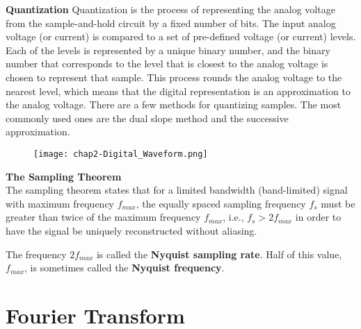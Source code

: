 \begin{compactitem}
\item \textbf{Quantization}
Quantization is the process of representing the analog voltage from the sample-and-hold
circuit by a fixed number of bits. The input analog voltage (or current) is compared to
a set of pre-defined voltage (or current) levels. Each of the levels is represented
by a unique binary number, and the binary number that corresponds to the level that is
closest to the analog voltage is chosen to represent that sample. This process rounds
the analog voltage to the nearest level, which means that the digital representation
is an approximation to the analog voltage. There are a few methods for quantizing samples.
The most commonly used ones are the dual slope method and the successive approximation.

\begin{figure}[ht]
  \centering
    \texttt{[image: chap2-Digital\_Waveform.png]}
  \caption{}
  \label{fig:chap2-Digital_Waveform}
\end{figure}


\item \textbf{The Sampling Theorem}\cite{dsp-nyquist}\\
The sampling theorem states that for a limited bandwidth (band-limited) signal with maximum frequency $f_{max}$,
the equally spaced sampling frequency $f_s$ must be greater than twice of the maximum frequency $f_{max}$, i.e.,
$f_s > 2 f_{max}$ in order to have the signal be uniquely reconstructed without aliasing.

The frequency $2 f_{max}$ is called the \textbf{Nyquist sampling rate}. Half of this value, $f_{max}$,
is sometimes called the \textbf{Nyquist frequency}.

\end{compactitem}

\section{Fourier Transform} \cite{csulb-Woollett}

